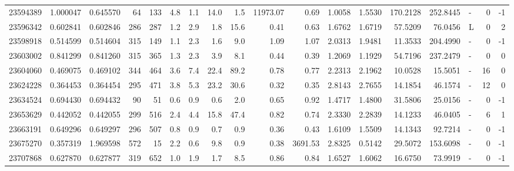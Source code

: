 \begin{tabular}{rrrrrrrrrrrrrrrlrr}
  23594389 & 1.000047 &   0.645570 &   64 &  133 &      4.8 &      1.1 &    14.0 &      1.5 &   11973.07 &        0.69 &  1.0058 &  1.5530 &  170.2128 &  252.8445 &             - &        0 &         -1 \\
  23596342 & 0.602841 &   0.602846 &  286 &  287 &      1.2 &      2.9 &     1.8 &     15.6 &       0.41 &        0.63 &  1.6762 &  1.6719 &   57.5209 &   76.0456 &             L &        0 &          2 \\
  23598918 & 0.514599 &   0.514604 &  315 &  149 &      1.1 &      2.3 &     1.6 &      9.0 &       1.09 &        1.07 &  2.0313 &  1.9481 &   11.3533 &  204.4990 &             - &        0 &         -1 \\
  23603002 & 0.841299 &   0.841260 &  315 &  365 &      1.3 &      2.3 &     3.9 &      8.1 &       0.44 &        0.39 &  1.2069 &  1.1929 &   54.7196 &  237.2479 &             - &        0 &          0 \\
  23604060 & 0.469075 &   0.469102 &  344 &  464 &      3.6 &      7.4 &    22.4 &     89.2 &       0.78 &        0.77 &  2.2313 &  2.1962 &   10.0528 &   15.5051 &             - &       16 &          0 \\
  23624228 & 0.364453 &   0.364454 &  295 &  471 &      3.8 &      5.3 &    23.2 &     30.6 &       0.32 &        0.35 &  2.8143 &  2.7655 &   14.1854 &   46.1574 &             - &       12 &          0 \\
  23634524 & 0.694430 &   0.694432 &   90 &   51 &      0.6 &      0.9 &     0.6 &      2.0 &       0.65 &        0.92 &  1.4717 &  1.4800 &   31.5806 &   25.0156 &             - &        0 &         -1 \\
  23653629 & 0.442052 &   0.442055 &  299 &  516 &      2.4 &      4.4 &    15.8 &     47.4 &       0.82 &        0.74 &  2.3330 &  2.2839 &   14.1233 &   46.0405 &             - &        6 &          1 \\
  23663191 & 0.649296 &   0.649297 &  296 &  507 &      0.8 &      0.9 &     0.7 &      0.9 &       0.36 &        0.43 &  1.6109 &  1.5509 &   14.1343 &   92.7214 &             - &        0 &         -1 \\
  23675270 & 0.357319 &   1.969598 &  572 &   15 &      2.2 &      0.6 &     9.8 &      0.9 &       0.38 &     3691.53 &  2.8325 &  0.5142 &   29.5072 &  153.6098 &             - &        0 &         -1 \\
  23707868 & 0.627870 &   0.627877 &  319 &  652 &      1.0 &      1.9 &     1.7 &      8.5 &       0.86 &        0.84 &  1.6527 &  1.6062 &   16.6750 &   73.9919 &             - &        0 &         -1 \\

\end{tabular}
